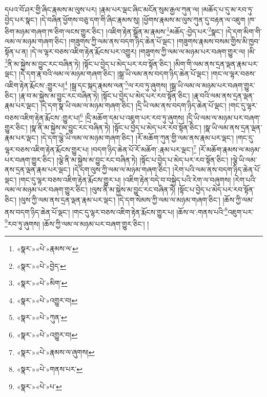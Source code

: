 དཔའ་བོ་ཤར་གྱི་ཞིང་རྣམས་མ་ལུས་པར། །རྣམ་པར་ལྡང་ཞིང་མངོན་སུམ་རྒྱལ་ཀུན་ལ། །མཆོད་པ་དུ་མ་རབ་ཏུ་བྱེད་པར་སྣང་། །དེ་བཞིན་ཕྱོགས་བཅུ་དག་གི་ཞིང་རྣམས་སུ། །ཕྱོགས་རྣམས་མ་ལུས་ཀུན་དུ་བརྟན་ལ་འཇུག །ཁ་ཅིག་མཉམ་གཞག་ཁ་ཅིག་ལངས་གྱུར་ཅིང་། །འཇིག་རྟེན་སྒྲོན་མ་རྣམས་\footnote{«སྣར་»«པེ་»རྣམས་ལ་}མཆོད་:བྱེད་པར་\footnote{«སྣར་»«པེ་»བྱེད་}སྣང་། །དེ་དག་མིག་གི་ལམ་ལ་མཉམ་གཞག་ཅིང་། །གཟུགས་ཀྱི་ལམ་ནས་བདག་ཉིད་ཆེན་པོ་ལྡང་། །གཟུགས་རྣམས་བསམ་གྱིས་མི་ཁྱབ་སྟོན་པ་ན། །དེ་ལ་ལྷར་བཅས་འཇིག་རྟེན་རྨོངས་པར་འགྱུར། །གཟུགས་ཀྱི་ལམ་ལ་མཉམ་པར་བཞག་གྱུར་ལ། །མི་\footnote{«སྣར་»«པེ་»མིག་}ནི་མ་སྐྱེས་མ་བྱུང་རང་བཞིན་ཏེ། །སྟོང་པ་བྱེད་པ་མེད་པར་རབ་སྟོན་ཅིང་། །མིག་གི་ལམ་ནས་དྲན་ལྡན་རྣམ་པར་ལྡང་། །དེ་དག་རྣ་བའི་ལམ་ལ་མཉམ་གཞག་ཅིང་། །སྒྲ་ཡི་ལམ་ནས་བདག་ཉིད་ཆེན་པོ་ལྡང་། །གང་ལ་ལྷར་བཅས་འཇིག་རྟེན་རྨོངས་:གྱུར་པ།\footnote{«སྣར་»«པེ་»འགྱུར་བ།} །སྒྲ་དང་སྐད་རྣམས་ལན་\footnote{«སྣར་»«པེ་»ཀུན་}ལ་རབ་ཏུ་ཞུགས། །སྒྲ་ཡི་ལམ་ལ་མཉམ་པར་བཞག་གྱུར་ཅིང་། །རྣ་བ་མ་སྐྱེས་མ་བྱུང་རང་བཞིན་ཏེ། །སྟོང་པ་བྱེད་པ་མེད་པར་རབ་སྟོན་ཅིང་། །རྣ་བའི་ལམ་ནས་དྲན་ལྡན་རྣམ་པར་ལྡང་། །དེ་དག་སྣ་ཡི་ལམ་ལ་མཉམ་གཞག་ཅིང་། །དྲི་ཡི་ལམ་ནས་བདག་ཉིད་ཆེན་པོ་ལྡང་། །གང་དུ་ལྷར་བཅས་འཇིག་རྟེན་རྨོངས་:གྱུར་པ།\footnote{«སྣར་»«པེ་»འགྱུར་བ།} །དྲི་མཆོག་དམ་པ་འཇུག་པར་རབ་ཏུ་ཞུགས། །དྲི་ཡི་ལམ་ལ་མཉམ་པར་བཞག་གྱུར་ཅིང་། །སྣ་ནི་མ་སྐྱེས་མ་བྱུང་རང་བཞིན་ཏེ། །སྟོང་པ་བྱེད་པ་མེད་པར་རབ་སྟོན་ཅིང་། །སྣ་ཡི་ལམ་ནས་དྲན་ལྡན་རྣམ་པར་ལྡང་། །དེ་དག་ལྕེ་ཡི་ལམ་ལ་མཉམ་གཞག་ཅིང་། །རོ་མཆོག་ཀུན་གྱི་ལམ་ནས་རྣམ་པར་ལྡང་། །གང་དུ་ལྷར་བཅས་འཇིག་རྟེན་རྨོངས་གྱུར་པ། །བདག་ཉིད་ཆེན་པོ་རོ་མཆོག་:རྣམ་པར་ལྡང་།\footnote{«སྣར་»«པེ་»རྣམས་ལ་ཞུགས།} །རོ་མཆོག་རྣམས་ལ་མཉམ་པར་བཞག་གྱུར་ཅིང་། །ལྕེ་ནི་མ་སྐྱེས་མ་བྱུང་རང་བཞིན་ཏེ། །སྟོང་པ་བྱེད་པ་མེད་པར་རབ་སྟོན་ཅིང་། །ལྕེ་ཡི་ལམ་ནས་དྲན་ལྡན་རྣམ་པར་ལྡང་། །དེ་དག་ལུས་ཀྱི་ལམ་ལ་མཉམ་གཞག་ཅིང་། །རེག་པའི་ལམ་ནས་བདག་ཉིད་ཆེན་པོ་ལྡང་། །གང་དུ་ལྷར་བཅས་འཇིག་རྟེན་རྨོངས་གྱུར་པ། །འཇིག་རྟེན་བདེ་བ་བསྐྱེད་པའི་རེག་ལ་བཞུགས། །རེག་པའི་ལམ་ལ་མཉམ་པར་བཞག་གྱུར་ཅིང་། །ལུས་ནི་མ་སྐྱེས་མ་བྱུང་རང་བཞིན་ཏེ། །སྟོང་པ་བྱེད་པ་མེད་པར་རབ་སྟོན་ཅིང་། །ལུས་ཀྱི་ལམ་ནས་དྲན་ལྡན་རྣམ་པར་ལྡང་། །དེ་དག་སེམས་ཀྱི་ལམ་ལ་མཉམ་གཞག་ཅིང་། །ཆོས་ཀྱི་ལམ་ནས་བདག་ཉིད་ཆེན་པོ་ལྡང་། །གང་དུ་ལྷར་བཅས་འཇིག་རྟེན་རྨོངས་གྱུར་པ། །ཆོས་ལ་:གནས་པའི་\footnote{«སྣར་»«པེ་»གནས་པར་}འཇུག་པར་\footnote{«སྣར་»«པེ་»པ་}རབ་ཏུ་ཞུགས། །ཆོས་ཀྱི་ལམ་ལ་མཉམ་པར་བཞག་གྱུར་ཅིང་། །
